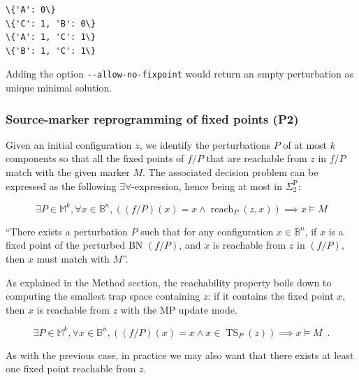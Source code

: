 \documentclass[PCJ,Unicode,screen,mode=plain]{cedram}
\begin{document}
    \begin{Verbatim}[commandchars=\\\{\}]
\{'A': 0\}
\{'C': 1, 'B': 0\}
\{'A': 1, 'C': 1\}
\{'B': 1, 'C': 1\}

    \end{Verbatim}
\medskip

Adding the option \texttt{-\/-allow-no-fixpoint} would return an empty
perturbation as unique minimal solution.
\hypertarget{source-marker-reprogramming-of-fixed-points-p2}{%
\subsubsection{Source-marker reprogramming of fixed points
(P2)}\label{source-marker-reprogramming-of-fixed-points-p2}}

Given an initial configuration \(z\), we identify the perturbations
\(P\) of at most \(k\) components so that all the fixed points of
\(f/P\) that are reachable from \(z\) in \(f/P\) match with the given
marker \(M\). The associated decision problem can be expressed as the
following \(\exists\forall\)-expression, hence being at most in
\(\Sigma_2^{\mathrm P}\):

\begin{equation}
\exists P\in\mathbb M^k, \forall x\in\mathbb B^n, ((f/P)(x)=x \wedge \operatorname{reach}_P(z,x))\implies x\models M
\end{equation}

``There exists a perturbation \(P\) such that for any configuration
\(x\in\mathbb B^n\), if \(x\) is a fixed point of the perturbed BN
\((f/P)\), and \(x\) is reachable from \(z\) in \((f/P)\), then \(x\)
must match with \(M\)''.

As explained in the Method section, the reachability property boils down
to computing the smallest trap space containing \(z\): if it contains
the fixed point \(x\), then \(x\) is reachable from \(z\) with the MP
update mode.

\begin{equation}
\exists P\in\mathbb M^k, \forall x\in\mathbb B^n, ((f/P)(x)=x \wedge 
x\in\operatorname{TS}_P(z))\implies x\models M\enspace.
\end{equation}

As with the previous case, in practice we may also want that there
exists at least one fixed point reachable from \(z\).
\end{document}
